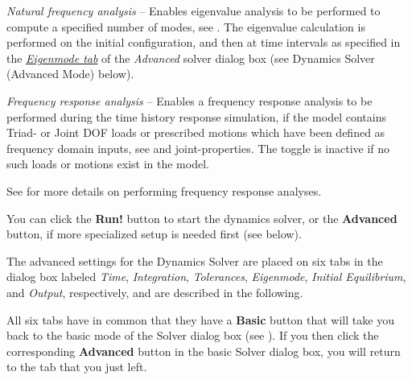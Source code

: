 \begin{bulletlist}
  \setcounter{enumi}{3}

\item{\sl Natural frequency analysis} -- Enables eigenvalue analysis
  to be performed to compute a specified number of modes, see
  .
  The eigenvalue calculation is performed on the initial configuration,
  and then at time intervals as specified in the
  \protect\hyperlink{eigenmode-tab}{\sl Eigenmode tab} of the {\sl Advanced}
  solver dialog box (see 
  {Dynamics Solver (Advanced Mode)} below).

\item{\sl Frequency response analysis} --
  Enables a frequency response analysis to be performed during the time history
  response simulation, if the model contains Triad- or Joint DOF loads or
  prescribed motions which have been defined as frequency domain inputs, see
   and
                {joint-properties}.
  The toggle is inactive if no such loads or motions exist in the model.

  See 
  for more details on performing frequency response analyses.
\end{bulletlist}

You can click the \textbf{Run!} button to start the dynamics solver, or the
\textbf{Advanced} button, if more specialized setup is needed first (see below).



The advanced settings for the Dynamics Solver are placed on six tabs in the
dialog box labeled {\sl Time}, {\sl Integration}, {\sl Tolerances},
{\sl Eigenmode}, {\sl Initial Equilibrium}, and {\sl Output}, respectively,
and are described in the following.

All six tabs have in common that they have a \textbf{Basic} button that will
take you back to the basic mode of the Solver dialog box
(see ).
If you then click the corresponding \textbf{Advanced} button in the basic
Solver dialog box, you will return to the tab that you just left.


